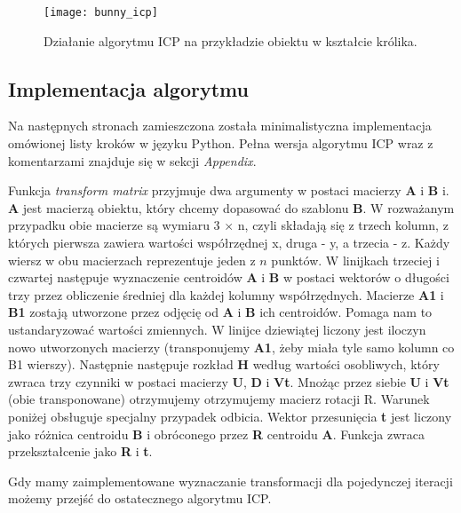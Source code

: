 \documentclass{article}
\begin{document}
\begin{figure}[h!]
\centering
\texttt{[image: bunny\_icp]}
\caption{Działanie algorytmu ICP na przykładzie obiektu w kształcie królika.}
\end{figure}

\newpage
\subsection*{\LARGE{Implementacja algorytmu}} 
Na następnych stronach zamieszczona została minimalistyczna implementacja omówionej listy kroków w języku Python. Pełna wersja algorytmu ICP wraz z komentarzami znajduje się w sekcji \emph{Appendix}.

\newpage

\vspace{5mm}

Funkcja \emph{transform matrix} przyjmuje dwa argumenty w postaci macierzy \textbf{A} i \textbf{B} i. \textbf{A} jest macierzą obiektu, który chcemy dopasować do szablonu \textbf{B}. W rozważanym przypadku obie macierze są wymiaru 3 $\times$ n, czyli składają się z trzech kolumn, z których pierwsza zawiera wartości współrzędnej x, druga - y, a trzecia - z. Każdy wiersz w obu macierzach reprezentuje jeden z $n$ punktów. W linijkach trzeciej i czwartej następuje wyznaczenie centroidów \textbf{A} i \textbf{B} w postaci wektorów o długości trzy przez obliczenie średniej dla każdej kolumny współrzędnych. Macierze \textbf{A1} i \textbf{B1} zostają utworzone przez odjęcię od \textbf{A} i \textbf{B} ich centroidów. Pomaga nam to ustandaryzować wartości zmiennych. W linijce dziewiątej liczony jest iloczyn nowo utworzonych macierzy (transponujemy \textbf{A1}, żeby miała tyle samo kolumn co B1 wierszy). Następnie następuje rozkład \textbf{H} według wartości osobliwych, który zwraca trzy czynniki w postaci macierzy \textbf{U}, \textbf{D} i \textbf{Vt}. Mnożąc przez siebie \textbf{U} i \textbf{Vt} (obie transponowane) otrzymujemy otrzymujemy macierz rotacji R. Warunek poniżej obsługuje specjalny przypadek odbicia. Wektor przesunięcia \textbf{t} jest liczony jako różnica centroidu \textbf{B} i obróconego przez \textbf{R} centroidu \textbf{A}. Funkcja zwraca przekształcenie jako \textbf{R} i \textbf{t}.

Gdy mamy zaimplementowane wyznaczanie transformacji dla pojedynczej iteracji możemy przejść do ostatecznego algorytmu ICP.

\vspace{5mm}

\vspace{5mm}
\end{document}
